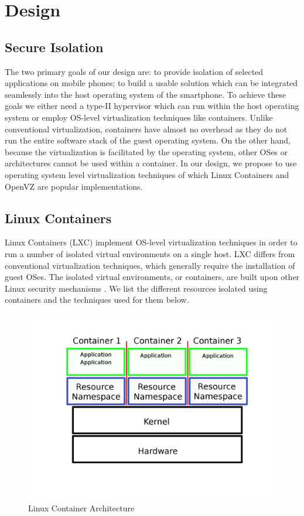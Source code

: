 \section{Design}
\label{sec:design}

\subsection{Secure Isolation}
The two primary goals of our design are: to provide isolation of selected applications on mobile phones; to build a usable solution which can be integrated seamlessly into the host operating system of the smartphone. To achieve these goals we either need a type-II hypervisor which can run within the host operating system or employ OS-level virtualization techniques like containers.  Unlike conventional virtualization, containers have almost no overhead as they do not run the entire software stack of the guest operating system.  On the other hand, because the virtualization is facilitated by the operating system, other OSes or architectures cannot be used within a container.  In our design, we propose to use operating system level virtualization techniques of which Linux Containers and OpenVZ \cite{OpenVZ} are popular implementations.\\
 
\subsection{Linux Containers}
Linux Containers (LXC) implement OS-level virtualization techniques in order to run a number of isolated virtual environments on a single host.  LXC differs from conventional virtualization techniques, which generally require the installation of guest OSes.  The isolated virtual environments, or containers, are built upon other Linux security mechanisms \cite{LSM}. We list the different resources isolated using containers and the techniques used for them below.

\begin{figure}[tbh]
\centering
\includegraphics[width=1.0\columnwidth]{containers}
\caption{Linux Container Architecture}
\label{fig:containers}
\end{figure}


